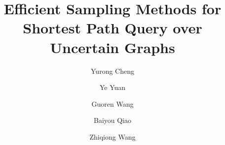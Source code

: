 \documentclass[runningheads,a4paper]{llncs}
\begin{document}
\mainmatter  %

\pagestyle{empty}

\title{Efficient Sampling Methods for Shortest Path Query over Uncertain Graphs}


%
%
\author{Yurong Cheng
\and Ye Yuan \and Guoren Wang \and Baiyou Qiao \and Zhiqiong Wang
}

%




%
%

\maketitle
\end{document}
